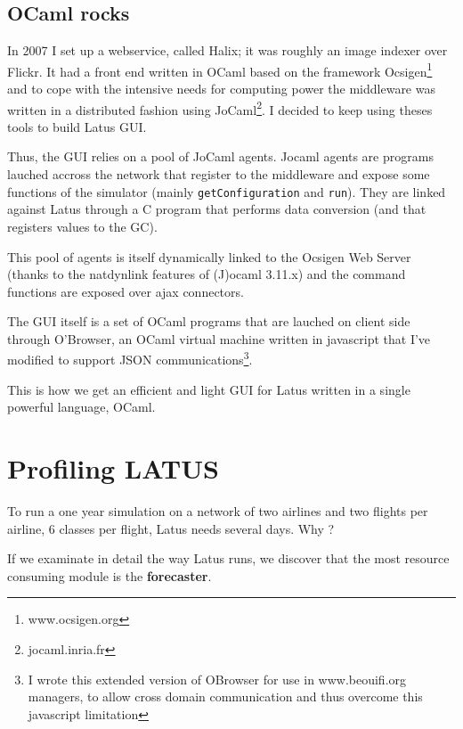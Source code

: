 \documentclass[11pt]{JHEP3}
\begin{document}
\subsection{OCaml rocks}

In 2007 I set up a webservice, called Halix; it was roughly an image indexer over Flickr. It had a front end written in OCaml based on the framework Ocsigen\footnote{www.ocsigen.org} and to cope with the intensive needs for computing power the middleware was written in a distributed fashion using JoCaml\footnote{jocaml.inria.fr}.  I decided to keep using theses tools to build Latus GUI. 

\par Thus, the GUI relies on a pool of JoCaml agents. Jocaml agents are programs lauched accross the network that register to the middleware and expose some functions of the simulator (mainly \texttt{getConfiguration} and \texttt{run}). They are linked against Latus through a C program that performs data conversion (and that registers values to the GC).

\par This pool of agents is itself dynamically linked to the Ocsigen Web Server (thanks to the natdynlink features of (J)ocaml 3.11.x) and the command functions are exposed over ajax connectors. 

\par The GUI itself is a set of OCaml programs that are lauched on client side through O'Browser, an OCaml virtual machine written in javascript that I've modified to support JSON communications\footnote{I wrote this extended version of OBrowser for use in www.beouifi.org managers, to allow cross domain communication and thus overcome this javascript limitation}.

This is how we get an efficient and light GUI for Latus written in a single powerful language, OCaml.

\newpage

\section{Profiling LATUS}

To run a one year simulation on a network of two airlines and two flights per airline, 6 classes per flight, Latus needs several days. Why ?

If we examinate in detail the way Latus runs, we discover that the most resource consuming module is the \textbf{forecaster}.
\end{document}
